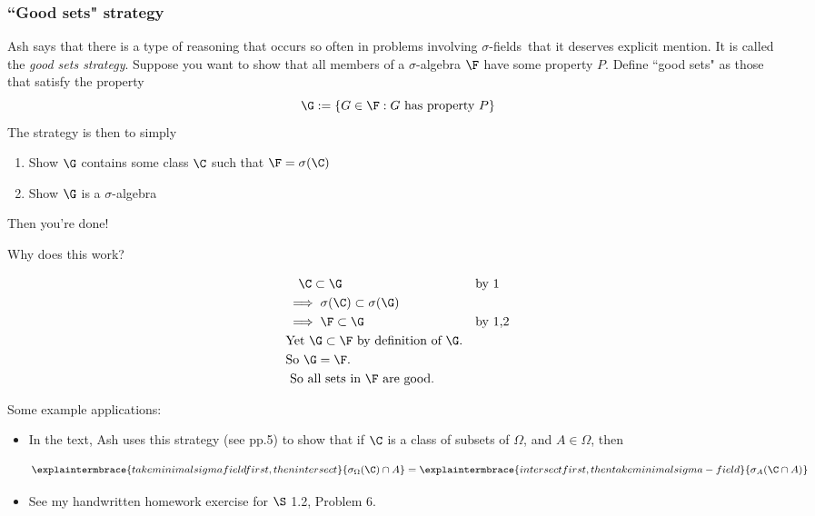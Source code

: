 \documentclass{article} %
\newcommand{\sfs}{$\sigma$-fields}
\begin{document}
\subsubsection{``Good sets" strategy} \label{sec:good_sets_strategy}

Ash says that there is a type of reasoning that occurs so often in problems involving \sfs\ that it deserves explicit mention.  It is called the \textit{good sets strategy}.   Suppose you want to show that all members of a $\sigma$-algebra   $\F$ have some property $P$.  Define ``good sets" as those that satisfy the property
\[ \G := \{ G \in \F : G \text{ has property } P \} \]
The strategy is then to simply
\begin{enumerate}
\item Show $\G$ contains some class $\C$ such that $\F = \sigma(\C)$
\item Show $\G$ is a $\sigma$-algebra 	
\end{enumerate}


Then you're done!  

Why does this work?

\begin{align*}
& \quad \C \subset \G &&	\text{by 1}\\
&\implies \sigma(\C) \subset \sigma(\G) &&  \\
&\implies \F \subset \G && \text{by 1,2} \\
& \text{Yet $\G \subset \F$ by definition of $\G$.} && \\
& \text{So $\G = \F$.} && \\
& \text{ So all sets in $\F$ are good.} && \\
\end{align*}

Some example applications:
 \begin{itemize}
 \item In the text, Ash uses this strategy (see pp.5) to show that if $\C$ is a class of subsets of $\Omega$, and $A \in \Omega$, then

\[ \explaintermbrace{take minimal sigma field first, then intersect}{\sigma_\Omega(\C) \cap A} = \explaintermbrace{intersect first, then take minimal sigma-field}{\sigma_A(\C \cap A)} \]
 \item  See my handwritten homework exercise for  $\S$ 1.2, Problem 6.
 \end{itemize}
\end{document}
